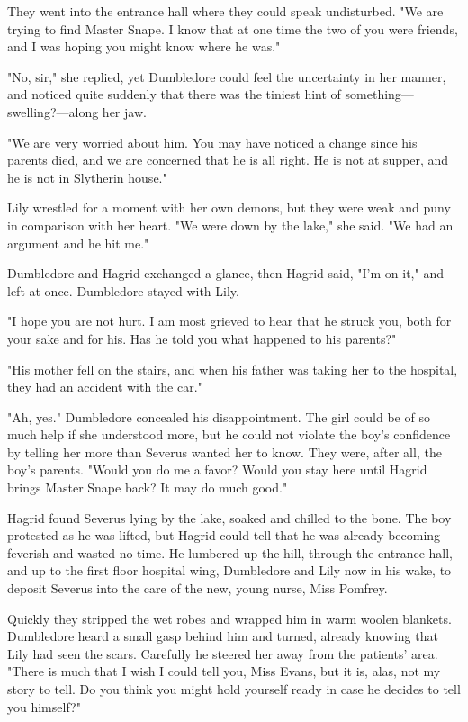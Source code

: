 They went into the entrance hall where they could speak undisturbed. "We are trying to find Master Snape. I know that at one time the two of you were friends, and I was hoping you might know where he was."

"No, sir," she replied, yet Dumbledore could feel the uncertainty in her manner, and noticed quite suddenly that there was the tiniest hint of something—swelling?—along her jaw.

"We are very worried about him. You may have noticed a change since his parents died, and we are concerned that he is all right. He is not at supper, and he is not in Slytherin house."

Lily wrestled for a moment with her own demons, but they were weak and puny in comparison with her heart. "We were down by the lake," she said. "We had an argument and{\el} he hit me."

Dumbledore and Hagrid exchanged a glance, then Hagrid said, "I'm on it," and left at once. Dumbledore stayed with Lily.

"I hope you are not hurt. I am most grieved to hear that he struck you, both for your sake and for his. Has he told you what happened to his parents?"

"His mother fell on the stairs, and when his father was taking her to the hospital, they had an accident with the car."

"Ah, yes." Dumbledore concealed his disappointment. The girl could be of so much help if she understood more, but he could not violate the boy's confidence by telling her more than Severus wanted her to know. They were, after all, the boy's parents. "Would you do me a favor? Would you stay here until Hagrid brings Master Snape back? It may do much good."

Hagrid found Severus lying by the lake, soaked and chilled to the bone. The boy protested as he was lifted, but Hagrid could tell that he was already becoming feverish and wasted no time. He lumbered up the hill, through the entrance hall, and up to the first floor hospital wing, Dumbledore and Lily now in his wake, to deposit Severus into the care of the new, young nurse, Miss Pomfrey.

Quickly they stripped the wet robes and wrapped him in warm woolen blankets. Dumbledore heard a small gasp behind him and turned, already knowing that Lily had seen the scars. Carefully he steered her away from the patients' area. "There is much that I wish I could tell you, Miss Evans, but it is, alas, not my story to tell. Do you think you might hold yourself ready in case he decides to tell you himself?"

